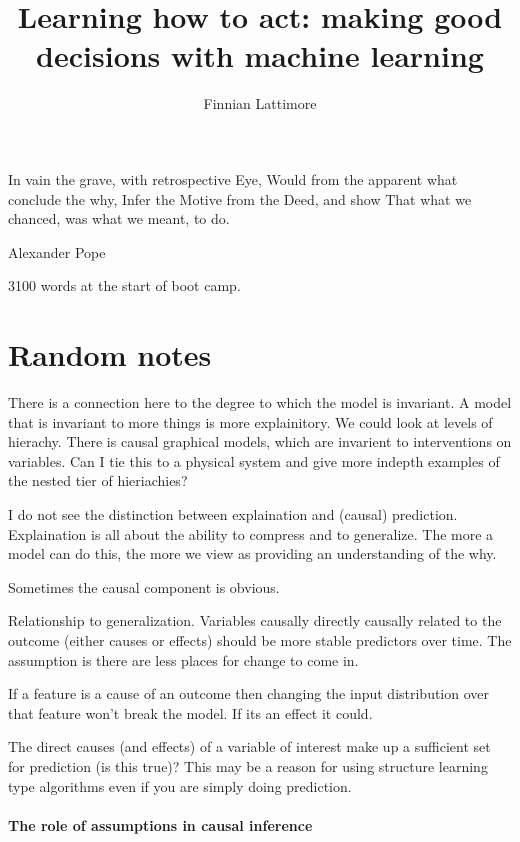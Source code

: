 \documentclass[11pt,a4paper,oneside]{book}
\author{Finnian Lattimore}
\title{Learning how to act: making good decisions with machine learning}
\begin{document}
\def\ci{\perp\!\!\!\perp} %

\maketitle

\epigraph{In vain the grave, with retrospective Eye,
Would from the apparent what conclude the why,
Infer the Motive from the Deed, and show
That what we chanced, was what we meant, to do.}{Alexander Pope}

3100 words at the start of boot camp.


\chapter*{Random notes}

There is a connection here to the degree to which the model is invariant. A model that is invariant to more things is more explainitory. We could look at levels of hierachy. There is causal graphical models, which are invarient to interventions on variables. Can I tie this to a physical system and give more indepth examples of the nested tier of hieriachies?

I do not see the distinction between explaination and (causal) prediction. Explaination is all about the ability to compress and to generalize. The more a model can do this, the more we view as providing an understanding of the why. 


Sometimes the causal component is obvious. 

Relationship to generalization. Variables causally directly causally related to the outcome (either causes or effects) should be more stable predictors over time. The assumption is there are less places for change to come in. 

If a feature is a cause of an outcome then changing the input distribution over that feature won't break the model. If its an effect it could.

The direct causes (and effects) of a variable of interest make up a sufficient set for prediction (is this true)? This may be a reason for using structure learning type algorithms even if you are simply doing prediction.

\subsubsection*{The role of assumptions in causal inference}
\end{document}
